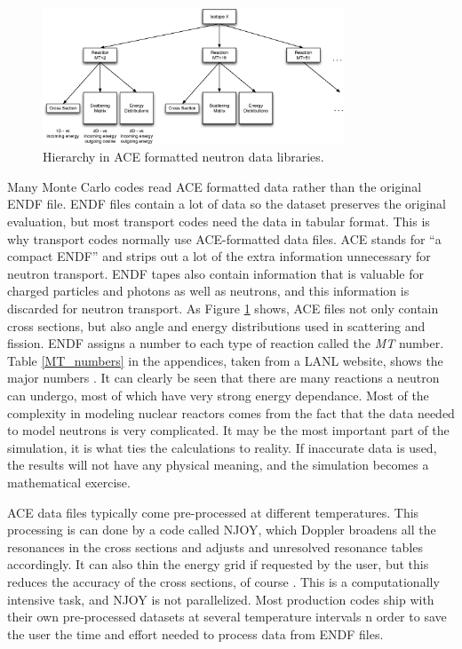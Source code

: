\begin{figure}[h!]
  \centering
    \includegraphics[width=0.8\textwidth]{graphics/data_levels.eps}
     \caption{Hierarchy in ACE formatted neutron data libraries.  \label{data_levels}}
\end{figure}

Many Monte Carlo codes read ACE formatted data rather than the original ENDF file.  ENDF files contain a lot of data so the dataset preserves the original evaluation, but most transport codes need the data in tabular format.  This is why transport codes normally use ACE-formatted data files. \cite{jaakko}  ACE stands for ``a compact ENDF'' and strips out a lot of the extra information unnecessary for neutron transport.  ENDF tapes also contain information that is valuable for charged particles and photons as well as neutrons, and this information is discarded for neutron transport.  As Figure \ref{data_levels} shows, ACE files not only contain cross sections, but also angle and energy distributions used in scattering and fission.  ENDF assigns a number to each type of reaction called the \emph{MT} number.  Table \ref{MT_numbers} in the appendices, taken from a LANL website, shows the major numbers \cite{MTnums}.  It can clearly be seen that there are many reactions a neutron can undergo, most of which have very strong energy dependance.  Most of the complexity in modeling nuclear reactors comes from the fact that the data needed to model neutrons is very complicated.  It may be the most important part of the simulation, it is what ties the calculations to reality.  If inaccurate data is used, the results will not have any physical meaning, and the simulation becomes a mathematical exercise.  

ACE data files typically come pre-processed at different temperatures.  This processing is can done by a code called NJOY, which Doppler broadens all the resonances in the cross sections and adjusts and unresolved resonance tables accordingly.  It can also thin the energy grid if requested by the user, but this reduces the accuracy of the cross sections, of course \cite{jaakko}.  This is a computationally intensive task, and NJOY is not parallelized.  Most production codes ship with their own pre-processed datasets at several temperature intervals n order to save the user the time and effort needed to process data from ENDF files.


